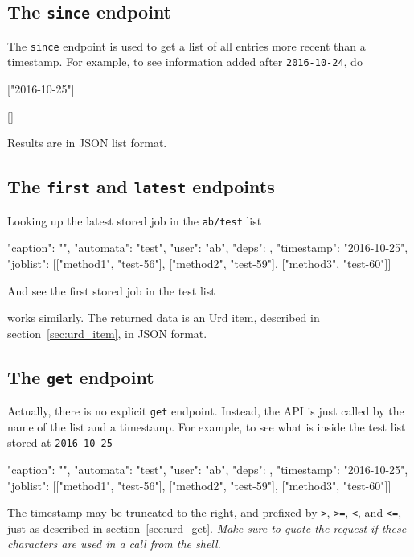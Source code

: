 \subsection{The \texttt{since} endpoint}
The \texttt{since} endpoint is used to get a list of all entries more
recent than a timestamp.  For example, to see information added
after \texttt{2016-10-24}, do
\begin{shell}
["2016-10-25"]
\end{shell}
\begin{shell}
[]
\end{shell}
Results are in JSON list format.



\subsection{The \texttt{first} and \texttt{latest} endpoints}
Looking up the latest stored job in the \texttt{ab/test} list
\begin{shell}
{"caption": "", "automata": "test", "user": "ab", "deps": {},
  "timestamp": "2016-10-25", "joblist": [["method1", "test-56"],
  ["method2", "test-59"], ["method3", "test-60"]]}
\end{shell}
And see the first stored job in the test list
\begin{shell}
\end{shell}
works similarly.  The returned data is an Urd item, described in
section~\ref{sec:urd_item}, in JSON format.



\subsection{The \texttt{get} endpoint}
Actually, there is no explicit \texttt{get} endpoint.  Instead, the
API is just called by the name of the list and a timestamp.  For
example, to see what is inside the test list stored
at \texttt{2016-10-25}
\begin{shell}
{"caption": "", "automata": "test", "user": "ab", "deps": {},
  "timestamp": "2016-10-25", "joblist": [["method1", "test-56"],
  ["method2", "test-59"], ["method3", "test-60"]]}
\end{shell}
The timestamp may be truncated to the right, and prefixed
by \texttt{>}, \texttt{>=}, \texttt{<}, and \texttt{<=}, just as
described in section~\ref{sec:urd_get}.  \textsl{Make sure to quote
the request if these characters are used in a call from the shell.}





